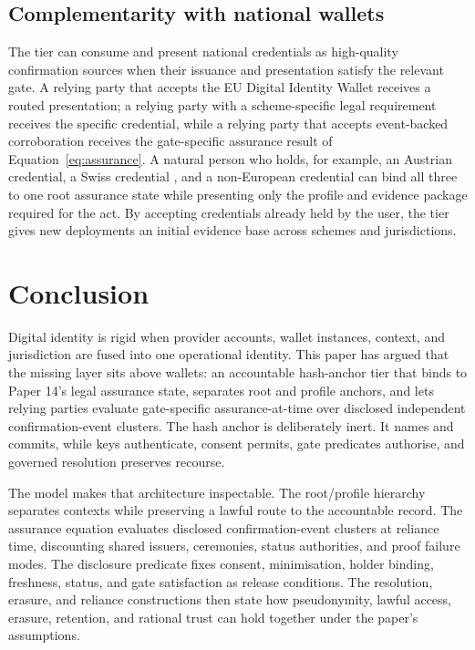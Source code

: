 \documentclass[oneside,10pt]{swissi}
\begin{document}
\subsection{Complementarity with national wallets}

The tier can consume and present national credentials as high-quality confirmation sources when their issuance and presentation satisfy the relevant gate. A relying party that accepts the EU Digital Identity Wallet \cite{eidas2024, eudiarf} receives a routed presentation; a relying party with a scheme-specific legal requirement receives the specific credential, while a relying party that accepts event-backed corroboration receives the gate-specific assurance result of Equation~\eqref{eq:assurance}. A natural person who holds, for example, an Austrian credential, a Swiss credential \cite{swisseid}, and a non-European credential can bind all three to one root assurance state while presenting only the profile and evidence package required for the act. By accepting credentials already held by the user, the tier gives new deployments an initial evidence base across schemes and jurisdictions.

\bigskip

\section{Conclusion}
\label{sec:conclusion}

Digital identity is rigid when provider accounts, wallet instances, context, and jurisdiction are fused into one operational identity. This paper has argued that the missing layer sits above wallets: an accountable hash-anchor tier that binds to Paper 14's legal assurance state, separates root and profile anchors, and lets relying parties evaluate gate-specific assurance-at-time over disclosed independent confirmation-event clusters. The hash anchor is deliberately inert. It names and commits, while keys authenticate, consent permits, gate predicates authorise, and governed resolution preserves recourse.

The model makes that architecture inspectable. The root/profile hierarchy separates contexts while preserving a lawful route to the accountable record. The assurance equation evaluates disclosed confirmation-event clusters at reliance time, discounting shared issuers, ceremonies, status authorities, and proof failure modes. The disclosure predicate fixes consent, minimisation, holder binding, freshness, status, and gate satisfaction as release conditions. The resolution, erasure, and reliance constructions then state how pseudonymity, lawful access, erasure, retention, and rational trust can hold together under the paper's assumptions.
\end{document}
